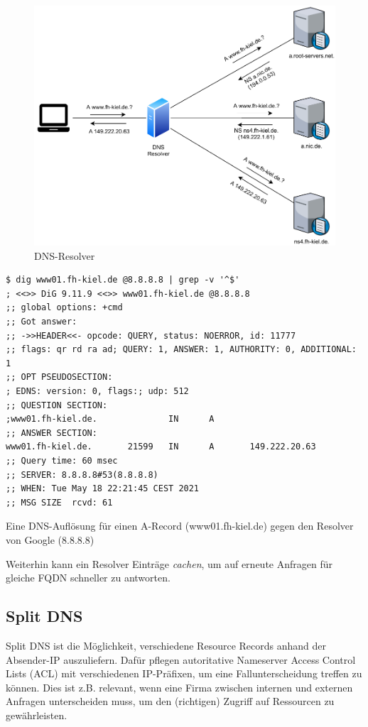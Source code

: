 \begin{figure}[h]
  \centering
  \includegraphics{Figures/dns_recursion.pdf}
  \caption{DNS-Resolver}
  \label{grafik: dns-resolver}
\end{figure}\FloatBarrier
\begin{listing}[h]
\begin{verbatim}
$ dig www01.fh-kiel.de @8.8.8.8 | grep -v '^$'
; <<>> DiG 9.11.9 <<>> www01.fh-kiel.de @8.8.8.8
;; global options: +cmd
;; Got answer:
;; ->>HEADER<<- opcode: QUERY, status: NOERROR, id: 11777
;; flags: qr rd ra ad; QUERY: 1, ANSWER: 1, AUTHORITY: 0, ADDITIONAL: 1
;; OPT PSEUDOSECTION:
; EDNS: version: 0, flags:; udp: 512
;; QUESTION SECTION:
;www01.fh-kiel.de.              IN      A
;; ANSWER SECTION:
www01.fh-kiel.de.       21599   IN      A       149.222.20.63
;; Query time: 60 msec
;; SERVER: 8.8.8.8#53(8.8.8.8)
;; WHEN: Tue May 18 22:21:45 CEST 2021
;; MSG SIZE  rcvd: 61
\end{verbatim}
\label{dig-example-fh-kiel}
\caption{Eine DNS-Auflösung für einen A-Record (www01.fh-kiel.de) gegen den Resolver von Google (8.8.8.8)}
\end{listing}\FloatBarrier


Weiterhin kann ein Resolver Einträge \textit{cachen}, um auf erneute Anfragen für gleiche FQDN schneller zu antworten.%

\subsection{Split DNS}
Split DNS ist die Möglichkeit, verschiedene Resource Records anhand der Absender-IP auszuliefern. Dafür pflegen autoritative Nameserver Access Control Lists (ACL) mit verschiedenen IP-Präfixen, um eine Fallunterscheidung treffen zu können\cite[S.565-567]{Fall2011}. Dies ist z.B. relevant, wenn eine Firma zwischen internen und externen Anfragen unterscheiden muss, um den (richtigen) Zugriff auf Ressourcen zu gewährleisten.

